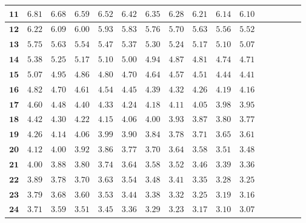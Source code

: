 \begin{alternateColorTable}
\begin{longtable}{|r|r|r|r|r|r|r|r|r|r|r|r|r|r|r|r|}
    \(\mathbf{11}\) & \(6.81\)  & \(6.68\)  & \(6.59\)  & \(6.52\)  & \(6.42\)  & \(6.35\)  & \(6.28\)  & \(6.21\)  & \(6.14\)  & \(6.10\) \\ \hline 
    \(\mathbf{12}\) & \(6.22\)  & \(6.09\)  & \(6.00\)  & \(5.93\)  & \(5.83\)  & \(5.76\)  & \(5.70\)  & \(5.63\)  & \(5.56\)  & \(5.52\) \\ \hline 
    \(\mathbf{13}\) & \(5.75\)  & \(5.63\)  & \(5.54\)  & \(5.47\)  & \(5.37\)  & \(5.30\)  & \(5.24\)  & \(5.17\)  & \(5.10\)  & \(5.07\) \\ \hline 
    \(\mathbf{14}\) & \(5.38\)  & \(5.25\)  & \(5.17\)  & \(5.10\)  & \(5.00\)  & \(4.94\)  & \(4.87\)  & \(4.81\)  & \(4.74\)  & \(4.71\) \\ \hline 
    \(\mathbf{15}\) & \(5.07\)  & \(4.95\)  & \(4.86\)  & \(4.80\)  & \(4.70\)  & \(4.64\)  & \(4.57\)  & \(4.51\)  & \(4.44\)  & \(4.41\) \\ \hline 
    \(\mathbf{16}\) & \(4.82\)  & \(4.70\)  & \(4.61\)  & \(4.54\)  & \(4.45\)  & \(4.39\)  & \(4.32\)  & \(4.26\)  & \(4.19\)  & \(4.16\) \\ \hline 
    \(\mathbf{17}\) & \(4.60\)  & \(4.48\)  & \(4.40\)  & \(4.33\)  & \(4.24\)  & \(4.18\)  & \(4.11\)  & \(4.05\)  & \(3.98\)  & \(3.95\) \\ \hline 
    \(\mathbf{18}\) & \(4.42\)  & \(4.30\)  & \(4.22\)  & \(4.15\)  & \(4.06\)  & \(4.00\)  & \(3.93\)  & \(3.87\)  & \(3.80\)  & \(3.77\) \\ \hline 
    \(\mathbf{19}\) & \(4.26\)  & \(4.14\)  & \(4.06\)  & \(3.99\)  & \(3.90\)  & \(3.84\)  & \(3.78\)  & \(3.71\)  & \(3.65\)  & \(3.61\) \\ \hline 
    \(\mathbf{20}\) & \(4.12\)  & \(4.00\)  & \(3.92\)  & \(3.86\)  & \(3.77\)  & \(3.70\)  & \(3.64\)  & \(3.58\)  & \(3.51\)  & \(3.48\) \\ \hline 
    \(\mathbf{21}\) & \(4.00\)  & \(3.88\)  & \(3.80\)  & \(3.74\)  & \(3.64\)  & \(3.58\)  & \(3.52\)  & \(3.46\)  & \(3.39\)  & \(3.36\) \\ \hline 
    \(\mathbf{22}\) & \(3.89\)  & \(3.78\)  & \(3.70\)  & \(3.63\)  & \(3.54\)  & \(3.48\)  & \(3.41\)  & \(3.35\)  & \(3.28\)  & \(3.25\) \\ \hline 
    \(\mathbf{23}\) & \(3.79\)  & \(3.68\)  & \(3.60\)  & \(3.53\)  & \(3.44\)  & \(3.38\)  & \(3.32\)  & \(3.25\)  & \(3.19\)  & \(3.16\) \\ \hline 
    \(\mathbf{24}\) & \(3.71\)  & \(3.59\)  & \(3.51\)  & \(3.45\)  & \(3.36\)  & \(3.29\)  & \(3.23\)  & \(3.17\)  & \(3.10\)  & \(3.07\) \\ \hline 

\end{longtable}
\end{alternateColorTable}
